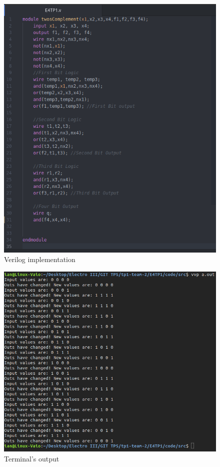 \begin{figure}[h!] %
\begin{centering}
\includegraphics[scale=0.4]{E4TP1/images/5}
\par\end{centering}
\caption{\color{cyan}Verilog implementation}
\label{fig:figura4.6}
\end{figure}

\begin{figure}[h!]%
\begin{centering}
\includegraphics[scale=0.4]{E4TP1/images/6}
\par\end{centering}
\caption{\color{cyan}Terminal's output}
\label{fig:figura4.7}
\end{figure}

%
